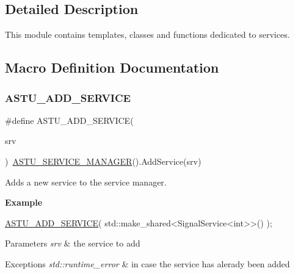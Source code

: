\subsection{Detailed Description}
This module contains templates, classes and functions dedicated to services. 



\subsection{Macro Definition Documentation}
\mbox{\label{group__srv__group_ga8c6572c2ee70b67d9dda0b8b0d77a7d2}} 
\subsubsection{\texorpdfstring{A\+S\+T\+U\+\_\+\+A\+D\+D\+\_\+\+S\+E\+R\+V\+I\+CE}{ASTU\_ADD\_SERVICE}}
{\footnotesize\ttfamily \#define A\+S\+T\+U\+\_\+\+A\+D\+D\+\_\+\+S\+E\+R\+V\+I\+CE(\begin{DoxyParamCaption}\item[{}]{srv }\end{DoxyParamCaption})~\hyperlink{group__srv__group_ga5216c57cf872d6a0c05d0e6f33c66fc7}{A\+S\+T\+U\+\_\+\+S\+E\+R\+V\+I\+C\+E\+\_\+\+M\+A\+N\+A\+G\+ER}().Add\+Service(srv)}

Adds a new service to the service manager.

{\bfseries Example}


\begin{DoxyCode}
\hyperlink{group__srv__group_ga8c6572c2ee70b67d9dda0b8b0d77a7d2}{ASTU\_ADD\_SERVICE}( std::make\_shared<SignalService<int>>() );
\end{DoxyCode}



\begin{DoxyParams}{Parameters}
{\em srv} & the service to add \\
\hline
\end{DoxyParams}

\begin{DoxyExceptions}{Exceptions}
{\em std\+::runtime\+\_\+error} & in case the service has alerady been added \\
\hline
\end{DoxyExceptions}
\mbox{\label{group__srv__group_ga91256015ad12618b8eda42106056a927}} 
